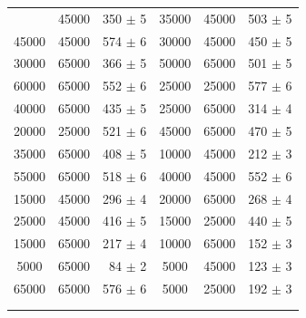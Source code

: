 \documentclass[../../main/main.tex]{subfiles}
\begin{document}
\begin{figure}[h]
\begin{minipage}[c]{0.49\linewidth}
{{{\begin{tabular}{ccc|ccc}
                    \colrule
                    20000 &	45000 & 350 $\pm$ 5  & 35000 &	45000 & 503 $\pm$ 5 \\
                    45000 &	45000 & 574 $\pm$ 6  & 30000 &	45000 & 450 $\pm$ 5 \\
                    30000 &	65000 & 366 $\pm$ 5  & 50000 &	65000 & 501 $\pm$ 5 \\
                    60000 &	65000 & 552 $\pm$ 6  & 25000 &	25000 & 577 $\pm$ 6 \\
                    40000 &	65000 & 435 $\pm$ 5  & 25000 &	65000 & 314 $\pm$ 4 \\
                    20000 &	25000 & 521 $\pm$ 6  & 45000 &	65000 & 470 $\pm$ 5 \\
                    35000 &	65000 & 408 $\pm$ 5  & 10000 &	45000 & 212 $\pm$ 3 \\
                    55000 &	65000 & 518 $\pm$ 6  & 40000 &	45000 & 552 $\pm$ 6 \\
                    15000 &	45000 & 296 $\pm$ 4  & 20000 &	65000 & 268 $\pm$ 4 \\
                    25000 &	45000 & 416 $\pm$ 5  & 15000 &	25000 & 440 $\pm$ 5 \\
                    15000 &	65000 & 217 $\pm$ 4  & 10000 &	65000 & 152 $\pm$ 3 \\
                     5000 &	65000 & \, 84 $\pm$ 2& 5000  &	45000 & 123 $\pm$ 3 \\
                    65000 &	65000 & 576 $\pm$ 6  & 5000  &  25000 & 192 $\pm$ 3\\                    
                    \colrule
                    \multicolumn{6}{c}{\textbf{Fit Results}}   \\
                    \colrule
                   

\end{tabular}}}}
\end{minipage}
\end{figure}
\end{document}
